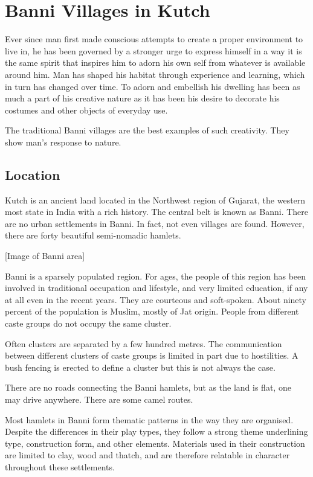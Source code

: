 \section{Banni Villages in Kutch} %
\label{sec:bvk}

Ever since man first made conscious attempts to create a proper environment to live in, he has been governed by a stronger urge to express himself in a way it is the same spirit that inspires him to adorn his own self from whatever is available around him. Man has shaped his habitat through experience and learning, which in turn has changed over time. To adorn and embellish his dwelling has been as much a part of his creative nature as it has been his desire to decorate his costumes and other objects of everyday use.

The traditional Banni villages are the best examples of such creativity. They show man's response to nature.

\subsection{Location} %
\label{sub:bvk_loc}

Kutch is an ancient land located in the Northwest region of Gujarat, the western most state in India with a rich history. The central belt is known as Banni. There are no urban settlements in Banni. In fact, not even villages are found. However, there are forty beautiful semi-nomadic hamlets.

[Image of Banni area]

Banni is a sparsely populated region. For ages, the people of this region has been involved in traditional occupation and lifestyle, and very limited education, if any at all even in the recent years. They are courteous and soft-spoken. About ninety percent of the population is Muslim, mostly of Jat origin. People from different caste groups do not occupy the same cluster.

Often clusters are separated by a few hundred metres. The communication between different clusters of caste groups is limited in part due to hostilities. A bush fencing is erected to define a cluster but this is not always the case.

There are no roads connecting the Banni hamlets, but as the land is flat, one may drive anywhere. There are some camel routes.

Most hamlets in Banni form thematic patterns in the way they are organised. Despite the differences in their play types, they follow a strong theme underlining type, construction form, and other elements. Materials used in their construction are limited to clay, wood and thatch, and are therefore relatable in character throughout these settlements.

